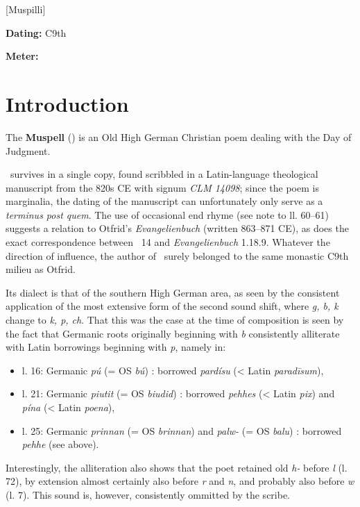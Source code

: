 [Muspilli]
\def\thisBookCode{Muspilli}

\begin{flushright}%
\textbf{Dating:} C9th

\textbf{Meter:} \Fornyrdislag%
\end{flushright}%

\section{Introduction}

The \textbf{Muspell} (\Muspilli) is an Old High German Christian poem dealing with the Day of Judgment.

\Muspilli\ survives in a single copy, found scribbled in a Latin-language theological manuscript from the 820s CE with signum \emph{CLM 14098}; since the poem is marginalia, the dating of the manuscript can unfortunately only serve as a \emph{terminus post quem}.  The use of occasional end rhyme (see note to ll. 60–61) suggests a relation to Otfrid’s \emph{Evangelienbuch} (written 863–871 CE), as does the exact correspondence between \Muspilli\ 14 and \emph{Evangelienbuch} 1.18.9.  Whatever the direction of influence, the author of \Muspilli\ surely belonged to the same monastic C9th milieu as Otfrid.

Its dialect is that of the southern High German area, as seen by the consistent application of the most extensive form of the second sound shift, where \emph{g, b, k} change to \emph{k, p, ch}.  That this was the case at the time of composition is seen by the fact that Germanic roots originally beginning with \emph{b} consistently alliterate with Latin borrowings beginning with \emph{p}, namely in:

\begin{itemize}
  \item l. 16: Germanic \emph{pú} (= OS \emph{bú}) : borrowed \emph{pardísu} (< Latin \emph{paradīsum}),
  \item l. 21: Germanic \emph{piutit} (= OS \emph{biudid}) : borrowed \emph{pehhes} (< Latin \emph{pix}) and \emph{pína} (< Latin \emph{poena}),
  \item l. 25: Germanic \emph{prinnan} (= OS \emph{brinnan}) and \emph{palw-} (= OS \emph{balu}) : borrowed \emph{pehhe} (see above).
\end{itemize}

Interestingly, the alliteration also shows that the poet retained old \emph{h-} before \emph{l} (l. 72), by extension almost certainly also before \emph{r} and \emph{n}, and probably also before \emph{w} (l. 7).  This sound is, however, consistently ommitted by the scribe.

